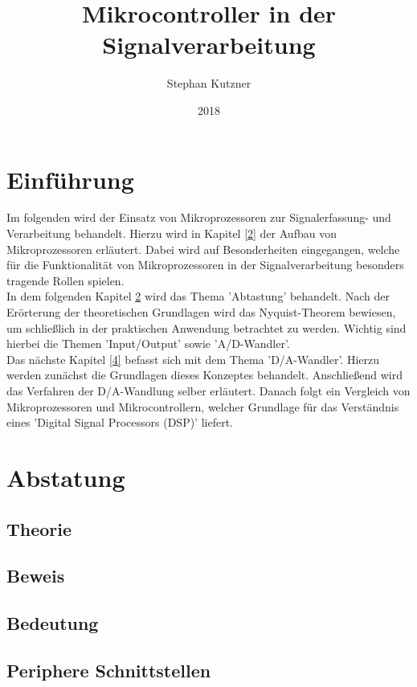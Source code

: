 \documentclass[a4paper,12pt]{article}
\title{Mikrocontroller in der Signalverarbeitung}
\date{2018}
\author{Stephan Kutzner}
\theoremstyle{plain}
\begin{document}
\maketitle
\tableofcontents
\section{Einführung}
Im folgenden wird der Einsatz von Mikroprozessoren zur Signalerfassung- und Verarbeitung behandelt. Hierzu wird in Kapitel \ref{2} der Aufbau von Mikroprozessoren erläutert. Dabei wird auf Besonderheiten eingegangen, welche für die Funktionalität von Mikroprozessoren in der Signalverarbeitung besonders tragende Rollen spielen.\\
In dem folgenden Kapitel \ref{3} wird das Thema 'Abtastung' behandelt. Nach der Erörterung der theoretischen Grundlagen wird das Nyquist-Theorem bewiesen, um schließlich in der praktischen Anwendung betrachtet zu werden. Wichtig sind hierbei die Themen 'Input/Output' sowie 'A/D-Wandler'.\\
Das nächste Kapitel \ref{4} befasst sich mit dem Thema 'D/A-Wandler'. Hierzu werden zunächst die Grundlagen dieses Konzeptes behandelt. Anschließend wird das Verfahren der D/A-Wandlung selber erläutert. Danach folgt ein Vergleich von Mikroprozessoren und Mikrocontrollern, welcher Grundlage für das Verständnis eines 'Digital Signal Processors (DSP)' liefert.\\

\newpage



\newpage
\section{Abstatung}\label{3}
\newpage
\subsection{Theorie}\label{3.1}
\subsection{Beweis}\label{3.2}
\subsection{Bedeutung}\label{3.3}
\subsection{Periphere Schnittstellen}\label{3.4}
\end{document}
